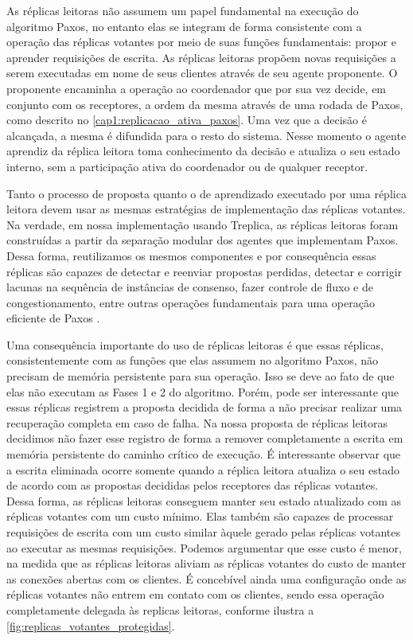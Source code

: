 As réplicas leitoras não assumem um papel fundamental na execução do algoritmo Paxos, no
entanto elas se integram de forma consistente com a operação das réplicas votantes por
meio de suas funções fundamentais: propor e aprender requisições de escrita. As réplicas
leitoras propõem novas requisições a serem executadas em nome de seus clientes através de
seu agente proponente. O proponente encaminha a operação ao coordenador que por sua vez
decide, em conjunto com os receptores, a ordem da mesma através de uma rodada de Paxos,
como descrito no \autoref{cap1:replicacao_ativa_paxos}. Uma vez que a decisão é alcançada,
a mesma é difundida para o resto do sistema. Nesse momento o agente aprendiz da réplica
leitora toma conhecimento da decisão e atualiza o seu estado interno, sem a participação
ativa do coordenador ou de qualquer receptor.

Tanto o processo de proposta quanto o de aprendizado executado por uma réplica leitora
devem usar as mesmas estratégias de implementação das réplicas votantes. Na verdade, em
nossa implementação usando Treplica, as réplicas leitoras foram construídas a partir da
separação modular dos agentes que implementam Paxos. Dessa forma, reutilizamos os mesmos
componentes e por consequência essas réplicas são capazes de detectar e reenviar propostas
perdidas, detectar e corrigir lacunas na sequência de instâncias de consenso, fazer
controle de fluxo e de congestionamento, entre outras operações fundamentais para uma
operação eficiente de Paxos \cite{vieira-tr10b}.

Uma consequência importante do uso de réplicas leitoras é que essas réplicas,
consistentemente com as funções que elas assumem no algoritmo Paxos, não precisam de
memória persistente para sua operação. Isso se deve ao fato de que elas não executam as
Fases 1 e 2 do algoritmo. Porém, pode ser interessante que essas réplicas registrem a
proposta decidida de forma a não precisar realizar uma recuperação completa em caso de
falha. Na nossa proposta de réplicas leitoras decidimos não fazer esse registro de forma a
remover completamente a escrita em memória persistente do caminho crítico de execução. É
interessante observar que a escrita eliminada ocorre somente quando a réplica leitora
atualiza o seu estado de acordo com as propostas decididas pelos receptores das réplicas
votantes. Dessa forma, as réplicas leitoras conseguem manter seu estado atualizado com as
réplicas votantes com um custo mínimo. Elas também são capazes de processar requisições de
escrita com um custo similar àquele gerado pelas réplicas votantes ao executar as mesmas
requisições. Podemos argumentar que esse custo é menor, na medida que as réplicas leitoras
aliviam as réplicas votantes do custo de manter as conexões abertas com os clientes. É
concebível ainda uma configuração onde as réplicas votantes não entrem em contato com os
clientes, sendo essa operação completamente delegada às replicas leitoras, conforme
ilustra a \autoref{fig:replicas_votantes_protegidas}.

